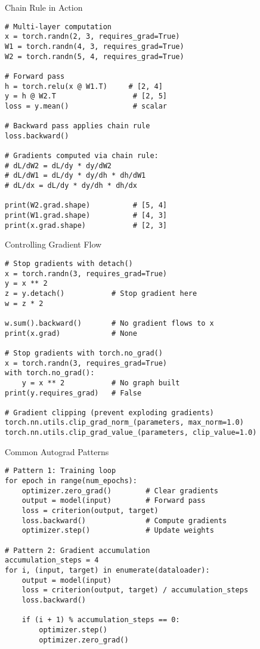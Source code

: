 \documentclass[aspectratio=169,10pt]{beamer}
\begin{document}
\begin{frame}[fragile]{Chain Rule in Action}
\begin{lstlisting}
# Multi-layer computation
x = torch.randn(2, 3, requires_grad=True)
W1 = torch.randn(4, 3, requires_grad=True)
W2 = torch.randn(5, 4, requires_grad=True)

# Forward pass
h = torch.relu(x @ W1.T)     # [2, 4]
y = h @ W2.T                  # [2, 5]
loss = y.mean()               # scalar

# Backward pass applies chain rule
loss.backward()

# Gradients computed via chain rule:
# dL/dW2 = dL/dy * dy/dW2
# dL/dW1 = dL/dy * dy/dh * dh/dW1
# dL/dx = dL/dy * dy/dh * dh/dx

print(W2.grad.shape)          # [5, 4]
print(W1.grad.shape)          # [4, 3]
print(x.grad.shape)           # [2, 3]
\end{lstlisting}
\end{frame}

\begin{frame}[fragile]{Controlling Gradient Flow}
\begin{lstlisting}
# Stop gradients with detach()
x = torch.randn(3, requires_grad=True)
y = x ** 2
z = y.detach()           # Stop gradient here
w = z * 2

w.sum().backward()       # No gradient flows to x
print(x.grad)            # None

# Stop gradients with torch.no_grad()
x = torch.randn(3, requires_grad=True)
with torch.no_grad():
    y = x ** 2           # No graph built
print(y.requires_grad)   # False

# Gradient clipping (prevent exploding gradients)
torch.nn.utils.clip_grad_norm_(parameters, max_norm=1.0)
torch.nn.utils.clip_grad_value_(parameters, clip_value=1.0)
\end{lstlisting}
\end{frame}

\begin{frame}[fragile]{Common Autograd Patterns}
\begin{lstlisting}
# Pattern 1: Training loop
for epoch in range(num_epochs):
    optimizer.zero_grad()        # Clear gradients
    output = model(input)        # Forward pass
    loss = criterion(output, target)
    loss.backward()              # Compute gradients
    optimizer.step()             # Update weights

# Pattern 2: Gradient accumulation
accumulation_steps = 4
for i, (input, target) in enumerate(dataloader):
    output = model(input)
    loss = criterion(output, target) / accumulation_steps
    loss.backward()
    
    if (i + 1) % accumulation_steps == 0:
        optimizer.step()
        optimizer.zero_grad()
\end{lstlisting}
\end{frame}
\end{document}
